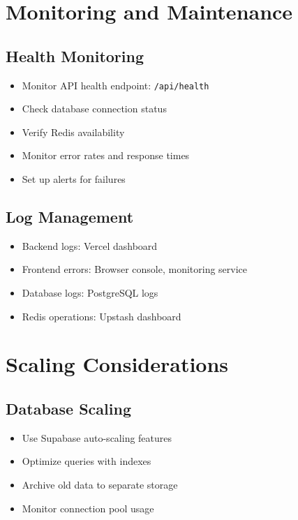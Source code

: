 \documentclass[12pt,a4paper]{report}
\begin{document}
\section{Monitoring and Maintenance}

\subsection{Health Monitoring}

\begin{itemize}
    \item Monitor API health endpoint: \texttt{/api/health}
    \item Check database connection status
    \item Verify Redis availability
    \item Monitor error rates and response times
    \item Set up alerts for failures
\end{itemize}

\subsection{Log Management}

\begin{itemize}
    \item Backend logs: Vercel dashboard
    \item Frontend errors: Browser console, monitoring service
    \item Database logs: PostgreSQL logs
    \item Redis operations: Upstash dashboard
\end{itemize}

\section{Scaling Considerations}

\subsection{Database Scaling}

\begin{itemize}
    \item Use Supabase auto-scaling features
    \item Optimize queries with indexes
    \item Archive old data to separate storage
    \item Monitor connection pool usage
\end{itemize}
\end{document}
